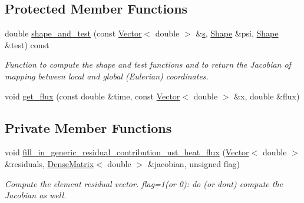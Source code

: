 \subsection*{Protected Member Functions}
\begin{DoxyCompactItemize}
\item 
double \hyperlink{classoomph_1_1UnsteadyHeatFluxElement_a0dc6fd954b29201949c26582d10c541c}{shape\+\_\+and\+\_\+test} (const \hyperlink{classoomph_1_1Vector}{Vector}$<$ double $>$ \&\hyperlink{cfortran_8h_ab7123126e4885ef647dd9c6e3807a21c}{s}, \hyperlink{classoomph_1_1Shape}{Shape} \&psi, \hyperlink{classoomph_1_1Shape}{Shape} \&test) const
\begin{DoxyCompactList}\small\item\em Function to compute the shape and test functions and to return the Jacobian of mapping between local and global (Eulerian) coordinates. \end{DoxyCompactList}\item 
void \hyperlink{classoomph_1_1UnsteadyHeatFluxElement_a3d15dd6c50e869f72a228ed8bc26147e}{get\+\_\+flux} (const double \&time, const \hyperlink{classoomph_1_1Vector}{Vector}$<$ double $>$ \&x, double \&flux)
\end{DoxyCompactItemize}
\subsection*{Private Member Functions}
\begin{DoxyCompactItemize}
\item 
void \hyperlink{classoomph_1_1UnsteadyHeatFluxElement_ad8558d61594ce5f92ecc4a898f2221b6}{fill\+\_\+in\+\_\+generic\+\_\+residual\+\_\+contribution\+\_\+ust\+\_\+heat\+\_\+flux} (\hyperlink{classoomph_1_1Vector}{Vector}$<$ double $>$ \&residuals, \hyperlink{classoomph_1_1DenseMatrix}{Dense\+Matrix}$<$ double $>$ \&jacobian, unsigned flag)
\begin{DoxyCompactList}\small\item\em Compute the element residual vector. flag=1(or 0)\+: do (or don\textquotesingle{}t) compute the Jacobian as well. \end{DoxyCompactList}\end{DoxyCompactItemize}

